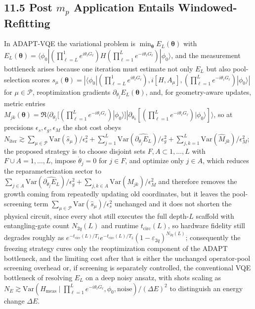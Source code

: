 \documentclass[11pt]{article}
\begin{document}
\subsection*{11.5 Post $m_p$ Application Entails Windowed-Refitting}
In ADAPT-VQE the variational problem is \(\min_{\boldsymbol\theta} E_L(\boldsymbol\theta)\) with \(E_L(\boldsymbol\theta)=\langle\phi_0|(\prod_{\ell=L}^{1}e^{i\theta_\ell G_\ell})H(\prod_{\ell=1}^{L}e^{-i\theta_\ell G_\ell})|\phi_0\rangle\), and the measurement bottleneck arises because one iteration must estimate not only \(E_L\) but also pool-selection scores \(s_\mu(\boldsymbol\theta)=|\langle\phi_0|(\prod_{\ell=L}^{1}e^{i\theta_\ell G_\ell}),i[H,A_\mu],(\prod_{\ell=1}^{L}e^{-i\theta_\ell G_\ell})|\phi_0\rangle|\) for \(\mu\in\mathcal P\), reoptimization gradients \(\partial_{\theta_j}E_L(\boldsymbol\theta)\), and, for geometry-aware updates, metric entries \(M_{jk}(\boldsymbol\theta)=\Re\langle \partial_{\theta_j}[(\prod_{\ell=1}^{L}e^{-i\theta_\ell G_\ell})|\phi_0\rangle]|\partial_{\theta_k}[(\prod_{\ell=1}^{L}e^{-i\theta_\ell G_\ell})|\phi_0\rangle]\rangle\), so at precisions \(\epsilon_s,\epsilon_g,\epsilon_M\) the shot cost obeys \(N_{\mathrm{iter}}\gtrsim \sum_{\mu\in\mathcal P}\mathrm{Var}(\hat s_\mu)/\epsilon_s^2+\sum_{j=1}^{L}\mathrm{Var}(\widehat{\partial_{\theta_j}E_L})/\epsilon_g^2+\sum_{j,k=1}^{L}\mathrm{Var}(\hat M_{jk})/\epsilon_M^2\); the proposed strategy is to choose disjoint sets \(F,A\subset{1,\dots,L}\) with \(F\cup A={1,\dots,L}\), impose \(\dot\theta_j=0\) for \(j\in F\), and optimize only \(j\in A\), which reduces the reparameterization sector to \(\sum_{j\in A}\mathrm{Var}(\widehat{\partial_{\theta_j}E_L})/\epsilon_g^2+\sum_{j,k\in A}\mathrm{Var}(\hat M_{jk})/\epsilon_M^2\) and therefore removes the growth coming from repeatedly updating old coordinates, but it leaves the pool-screening term \(\sum_{\mu\in\mathcal P}\mathrm{Var}(\hat s_\mu)/\epsilon_s^2\) unchanged and it does not shorten the physical circuit, since every shot still executes the full depth-\(L\) scaffold with entangling-gate count \(N_{2q}(L)\) and runtime \(t_{\mathrm{circ}}(L)\), so hardware fidelity still degrades roughly as \(e^{-t_{\mathrm{circ}}(L)/T_1}e^{-t_{\mathrm{circ}}(L)/T_2}(1-\varepsilon_{2q})^{N_{2q}(L)}\); consequently the freezing strategy cures only the reoptimization component of the ADAPT bottleneck, and the limiting cost after that is either the unchanged operator-pool screening overhead or, if screening is separately controlled, the conventional VQE bottleneck of resolving \(E_L\) on a deep noisy ansatz, with shots scaling as \(N_E\gtrsim \mathrm{Var}(H_{\mathrm{meas}}\mid \prod_{\ell=1}^{L}e^{-i\theta_\ell G_\ell},\phi_0,\text{noise})/(\Delta E)^2\) to distinguish an energy change \(\Delta E\).
\end{document}
